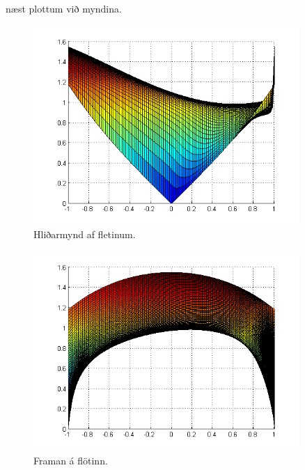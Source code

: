 \documentclass[11pt,a4paper,titlepage]{article}
\begin{document}
næst plottum við myndina. 
  \begin{figure}[h!]
      \centering
      \includegraphics[width=0.9\textwidth]{lagmarksflotur_hlid.png}
      \caption{Hliðarmynd af fletinum.}
      \label{fig:awesome_image12}
  \end{figure}
  
    \begin{figure}[h!]
        \centering
        \includegraphics[width=0.9\textwidth]{lagmarksflotur_framan.png}
        \caption{Framan á flötinn.}
        \label{fig:awesome_image12}
    \end{figure}
\end{document}

